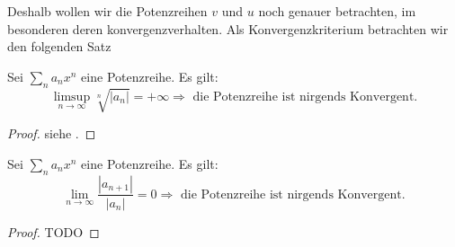 Deshalb wollen wir die Potenzreihen $v$ und $u$ noch genauer betrachten, im
besonderen deren konvergenzverhalten. Als Konvergenzkriterium betrachten wir
den folgenden Satz
\begin{thm} \label{thm:convKrit}
Sei $\sum_n a_n x^n$ eine Potenzreihe. Es gilt:
\[
\underset{n\rightarrow\infty}{\limsup} \sqrt[n]{|a_n|} = +\infty 
\Rightarrow \text{ die Potenzreihe ist nirgends Konvergent.}
\]
\end{thm}
\begin{proof}
siehe \cite[§18, Satz 94]{KnoppReihen}.
\end{proof}

\begin{thm}[Quotientenkriterium]
Sei $\sum_n a_n x^n$ eine Potenzreihe. Es gilt:
\[
\underset{n\rightarrow\infty}{\lim} \frac{|a_{n+1}|}{|a_n|} = 0
\Rightarrow \text{ die Potenzreihe ist nirgends Konvergent.}
\]
\end{thm}
\begin{proof}
TODO
\end{proof}


